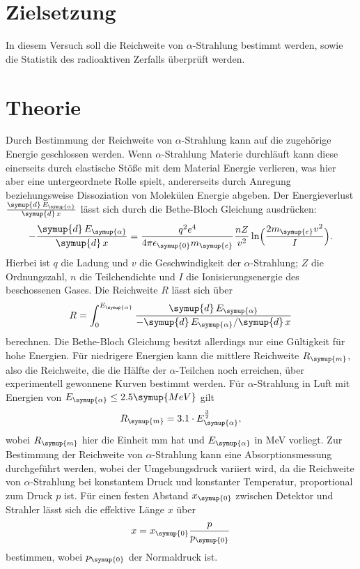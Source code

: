 \section{Zielsetzung}
    In diesem Versuch soll die Reichweite von $\alpha$-Strahlung bestimmt werden, sowie die Statistik des radioaktiven Zerfalls überprüft werden.
\section{Theorie}
\label{sec:Theorie}
    Durch Bestimmung der Reichweite von $\alpha$-Strahlung kann auf die zugehörige Energie geschlossen werden. Wenn $\alpha$-Strahlung
    Materie durchläuft kann diese einerseits durch elastische Stöße mit dem Material Energie verlieren, was hier aber eine untergeordnete
    Rolle spielt, andererseits durch Anregung beziehungsweise Dissoziation von Molekülen Energie abgeben. Der Energieverlust
    $\frac{\symup{d} \, E_{\symup{\alpha}}} {\symup{d} \, x}$ lässt sich durch die Bethe-Bloch Gleichung ausdrücken:
    \begin{equation}
    \label{eqn:bethe-bloch}
       - \frac{\symup{d} \, E_{\symup{\alpha}}} {\symup{d} \, x} = \frac{q^2 e^4} {4 \pi \epsilon_{\symup{0}} m_{\symup{e}}} \frac{n Z} {v^2} \ln \Bigl( \frac{2 m_{\symup{e}} v^2 }{I} \Bigr).
   \end{equation}    
   Hierbei ist $q$ die Ladung und $v$ die Geschwindigkeit der $\alpha$-Strahlung; $Z$ die Ordnungszahl, $n$ die Teilchendichte und $I$ die 
   Ionisierungsenergie des beschossenen Gases. Die Reichweite $R$ lässt sich über 
   \begin{equation}
   \label{eqn:Reichweite}
        R = \int_0^{E_{\symup{\alpha}}} \frac{\symup{d} \, E_{\symup{\alpha}}} {-\symup{d} \, E_{\symup{\alpha}} / \symup{d} \, x  }
   \end{equation}
   berechnen. Die Bethe-Bloch Gleichung besitzt allerdings nur eine Gültigkeit für hohe Energien. Für niedrigere Energien kann die mittlere
   Reichweite $R_{\symup{m}}$, also die Reichweite, die die Hälfte der $\alpha$-Teilchen noch erreichen, über experimentell gewonnene Kurven bestimmt werden.
   Für $\alpha$-Strahlung in Luft mit Energien von $E_{\symup{\alpha}} \leq 2.5 \symup{MeV}$ gilt 
   \begin{equation}
   \label{eqn:mittlere-reichweite}
        R_{\symup{m}} = 3.1 \cdot E_{\symup{\alpha}}^{\frac{3}{2}}, 
   \end{equation}     
   wobei $ R_{\symup{m}} $ hier die Einheit mm hat und $E_{\symup{\alpha}}$ in MeV vorliegt.
   Zur Bestimmung der Reichweite von $\alpha$-Strahlung kann eine Absorptionsmessung durchgeführt werden, wobei der Umgebungsdruck variiert wird,
   da die Reichweite von $\alpha$-Strahlung bei konstantem Druck und konstanter Temperatur, proportional zum Druck $p$ ist. Für einen 
   festen Abstand $x_{\symup{0}}$ zwischen Detektor und Strahler lässt sich die effektive Länge $x$ über 
   \begin{equation}
   \label{eqn:effektive-laenge}
        x = x_{\symup{0}} \frac{p}{p_{\symup{0}}}
   \end{equation}
   bestimmen, wobei $p_{\symup{0}}$ der Normaldruck ist.     